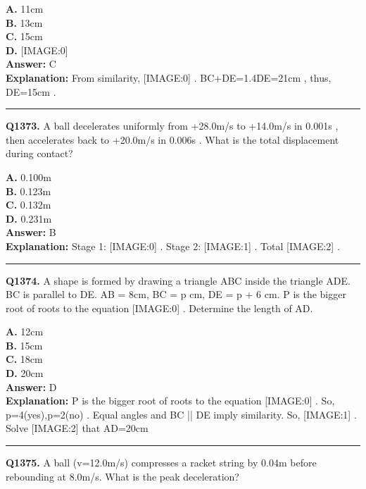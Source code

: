 \documentclass[12pt]{article}
\begin{document}
\textbf{A.} 11cm \\
\textbf{B.} 13cm \\
\textbf{C.} 15cm \\
\textbf{D.} [IMAGE:0] \\

\textbf{Answer:} C \\
\textbf{Explanation:} From similarity,
[IMAGE:0]
. BC+DE=1.4DE=21cm
, thus, DE=15cm
.

\hrule
\vspace{1em}


\noindent
\textbf{Q1373.} A ball decelerates uniformly from +28.0m/s
to +14.0m/s
in 0.001s
, then accelerates back to +20.0m/s
in 0.006s
.
What is the total displacement during contact?



\textbf{A.} 0.100m \\
\textbf{B.} 0.123m \\
\textbf{C.} 0.132m \\
\textbf{D.} 0.231m \\

\textbf{Answer:} B \\
\textbf{Explanation:} Stage 1:
[IMAGE:0]
. Stage 2:
[IMAGE:1]
. Total
[IMAGE:2]
.

\hrule
\vspace{1em}


\noindent
\textbf{Q1374.} A shape is formed by drawing a triangle ABC inside the triangle ADE. BC is parallel to DE. AB = 8cm, BC = p cm, DE = p + 6 cm. P
is the bigger root of roots to the equation
[IMAGE:0]
.
Determine the length of AD.



\textbf{A.} 12cm \\
\textbf{B.} 15cm \\
\textbf{C.} 18cm \\
\textbf{D.} 20cm \\

\textbf{Answer:} D \\
\textbf{Explanation:} P
is the bigger root of roots to the equation
[IMAGE:0]
. So, p=4(yes),p=2(no)
.
Equal angles and BC || DE imply similarity.
So,
[IMAGE:1]
.
Solve
[IMAGE:2]
that AD=20cm

\hrule
\vspace{1em}


\noindent
\textbf{Q1375.} A ball (v=12.0m/s)
compresses a racket string by 0.04m
before rebounding at 8.0m/s.
What is the peak deceleration?
\end{document}
